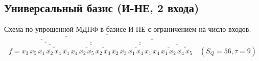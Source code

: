 \documentclass{article}
\begin{document}
\subsection*{Универсальный базис (И-НЕ, 2 входа)}
Схема по упрощенной МДНФ в базисе И-НЕ с ограничением на число входов:
\[f = \overline{\overline{\overline{\overline{x_{3} \, \overline{\overline{x_{5} \, \overline{x_{1} \, \overline{\overline{\overline{x_{2}} \, \overline{x_{4}}}}}}}} \, \overline{\overline{x_{1}} \, \overline{\overline{x_{4} \, \overline{\overline{\overline{x_{2}} \, \overline{x_{5}}} \, \overline{x_{2} \, \overline{x_{3}}}}}}}}} \, \overline{\overline{\overline{\overline{x_{2}} \, \overline{\overline{\overline{x_{3}} \, \overline{\overline{\overline{x_{1}} \, \overline{x_{4}}} \, \overline{x_{1} \, x_{4}}}}}} \, \overline{\overline{\overline{x_{1} \, x_{2}}} \, \overline{\overline{\overline{x_{4}} \, \overline{x_{5}}}}}}}}\quad(S_Q = 56, \tau = 9)\]
\end{document}
